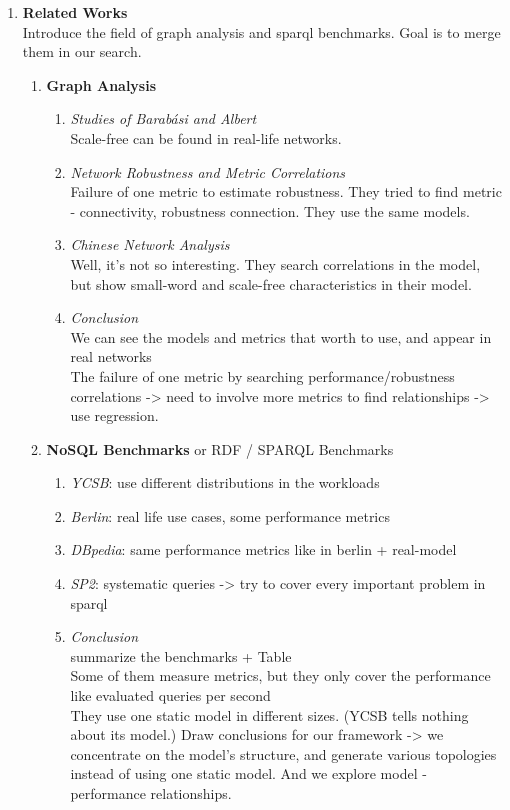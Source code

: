 \begin{enumerate}
		
	\item \textbf{Related Works}\\Introduce the field of graph analysis and sparql benchmarks. Goal is to merge them in our search.
		\begin{enumerate}[label*=\arabic*.]
			\item \textbf{Graph Analysis}
				\begin{enumerate}[label*=\arabic*.]
					\item \textit{Studies of Barabási and Albert}\\
						Scale-free can be found in real-life networks.
					\item \textit{Network Robustness and Metric Correlations}\\
						Failure of one metric to estimate robustness. They tried to find metric - connectivity, robustness connection. They use the same models.
					\item \textit{Chinese Network Analysis}\\
						Well, it's not so interesting. They search correlations in the model, but show small-word and scale-free characteristics in their model.
					\item \textit{Conclusion}\\We can see the models and metrics that worth to use, and appear in real networks\\
						The failure of one metric by searching performance/robustness correlations -> need to involve more metrics to find relationships -> use regression.
				\end{enumerate}
			\item \textbf{NoSQL Benchmarks} or RDF / SPARQL Benchmarks
				\begin{enumerate}[label*=\arabic*.]
					\item \textit{YCSB}: use different distributions in the workloads
					\item \textit{Berlin}: real life use cases, some performance metrics
					\item \textit{DBpedia}: same performance metrics like in berlin + real-model
					\item \textit{SP2}: systematic queries -> try to cover every important problem in sparql
					\item \textit{Conclusion}\\summarize the benchmarks + Table\\
					Some of them measure metrics, but they only cover the performance like evaluated queries per second\\
					They use one static model in different sizes. (YCSB tells nothing about its model.)
					Draw conclusions for our framework -> we concentrate on the model's structure, and generate various topologies instead of using one static model. And we explore model - performance relationships.
				\end{enumerate}
		\end{enumerate}
		

\end{enumerate}
